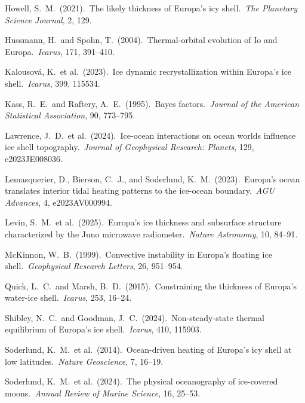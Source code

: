 \documentclass[11pt,letterpaper]{article}
\begin{document}
\begin{enumerate}[label={[\arabic*]},nosep,leftmargin=*]
\item Howell, S.\ M.\ (2021).\ The likely thickness of Europa's icy shell.\ \textit{The Planetary Science Journal}, 2, 129.

\item Hussmann, H.\ and Spohn, T.\ (2004).\ Thermal-orbital evolution of Io and Europa.\ \textit{Icarus}, 171, 391--410.

\item Kalousov\'{a}, K.\ et al.\ (2023).\ Ice dynamic recrystallization within Europa's ice shell.\ \textit{Icarus}, 399, 115534.

\item Kass, R.\ E.\ and Raftery, A.\ E.\ (1995).\ Bayes factors.\ \textit{Journal of the American Statistical Association}, 90, 773--795.

\item Lawrence, J.\ D.\ et al.\ (2024).\ Ice-ocean interactions on ocean worlds influence ice shell topography.\ \textit{Journal of Geophysical Research: Planets}, 129, e2023JE008036.

\item Lemasquerier, D., Bierson, C.\ J., and Soderlund, K.\ M.\ (2023).\ Europa's ocean translates interior tidal heating patterns to the ice-ocean boundary.\ \textit{AGU Advances}, 4, e2023AV000994.

\item Levin, S.\ M.\ et al.\ (2025).\ Europa's ice thickness and subsurface structure characterized by the Juno microwave radiometer.\ \textit{Nature Astronomy}, 10, 84--91.

\item McKinnon, W.\ B.\ (1999).\ Convective instability in Europa's floating ice shell.\ \textit{Geophysical Research Letters}, 26, 951--954.

\item Quick, L.\ C.\ and Marsh, B.\ D.\ (2015).\ Constraining the thickness of Europa's water-ice shell.\ \textit{Icarus}, 253, 16--24.

\item Shibley, N.\ C.\ and Goodman, J.\ C.\ (2024).\ Non-steady-state thermal equilibrium of Europa's ice shell.\ \textit{Icarus}, 410, 115903.

\item Soderlund, K.\ M.\ et al.\ (2014).\ Ocean-driven heating of Europa's icy shell at low latitudes.\ \textit{Nature Geoscience}, 7, 16--19.

\item Soderlund, K.\ M.\ et al.\ (2024).\ The physical oceanography of ice-covered moons.\ \textit{Annual Review of Marine Science}, 16, 25--53.


\end{enumerate}
\end{document}

